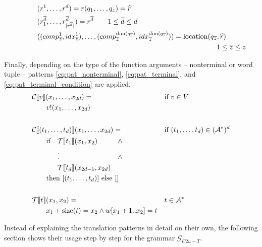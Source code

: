 \documentclass[
    a4paper,
    12pt,
    twoside,
    BCOR=12mm,
    parskip=half,
    chapterprefix,
    numbers=noenddot,
    bibliography=totoc
]{scrbook}
\begin{document}
\begin{align}
		&\qquad\quad (r^1,\ldots,r^d) = r(q_1,\ldots,q_z) = \widehat{r} \nonumber\\
		&\qquad\quad (r^{\overline{d}}_1,\ldots,r^{\overline{d}}_{|r^{\overline{d}}|}) = r^{\overline{d}} \qquad 1 \leq \overline{d} \leq d \nonumber\\
		&\qquad\quad  ((comp^1_{\overline{z}},idx^1_{\overline{z}}),\ldots,(comp^{\op{dim}(q_{\overline{z}})}_{\overline{z}},idx^{\op{dim}(q_{\overline{z}})}_{\overline{z}})) = \op{location}(q_{\overline{z}}, \widehat{r}) \nonumber\\
		&\hspace{10cm} 1 \leq \overline{z} \leq z \nonumber
\end{align}

Finally, depending on the type of the function arguments -- nonterminal or word tuple -- patterns \ref{eq:pat_nonterminal}, \ref{eq:pat_terminal}, and \ref{eq:pat_terminal_condition} are applied.
\begin{align}
	&\mathcal{C}\llbracket v \rrbracket(x_1,\ldots,x_{2d}) = && \text{if } v \in V \label{eq:pat_nonterminal} \\
		&\qquad v!(x_1,\ldots,x_{2d}) \nonumber\\
  \nonumber\\
	&\mathcal{C}\llbracket (t_1,\ldots,t_d) \rrbracket(x_1,\ldots,x_{2d}) = && \text{if } (t_1,\ldots,t_d) \in (\mathcal{A}^*)^d \label{eq:pat_terminal} \\
		&\qquad \mathrlap{ 
		\!\begin{aligned}
			&\text{if} && \mathcal{T}\llbracket t_1 \rrbracket(x_1,x_2) & \wedge \\
			&&&\vdots & \wedge\\
			&&&\mathcal{T}\llbracket t_d \rrbracket(x_{2d-1},x_{2d}) &\\
			&\mathrlap{\text{then } [(t_1,\ldots,t_d)] \text{ else } []} &&&
		\end{aligned} } \nonumber\\
	\nonumber\\
	&\mathcal{T}\llbracket t \rrbracket(x_1,x_2) = && t \in \mathcal{A}^* \label{eq:pat_terminal_condition} \\
		&\qquad x_1 + \op{size}(t) = x_2 \wedge w[x_1+1..x_2] = t \nonumber
\end{align}

Instead of explaining the translation patterns in detail on their own, the following section shows their usage step by step for the grammar $\mathcal{G}_{C2u-T}$.
\end{document}
